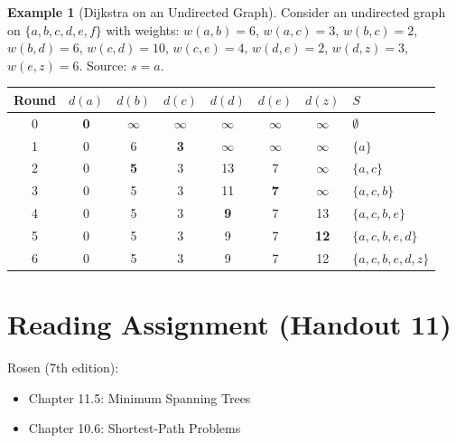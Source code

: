 \documentclass[11pt, a4paper, notitlepage]{report}
\theoremstyle{definition}
\newtheorem{example}[theorem]{Example}
\theoremstyle{remark}
\begin{document}
\begin{example}[Dijkstra on an Undirected Graph]
\label{ex:dijkstra-undirected}
Consider an undirected graph on $\{a,b,c,d,e,f\}$ with weights:
$w(a,b)=6$, $w(a,c)=3$, $w(b,c)=2$, $w(b,d)=6$, $w(c,d)=10$,
$w(c,e)=4$, $w(d,e)=2$, $w(d,z)=3$, $w(e,z)=6$. Source: $s = a$.

\begin{center}
\begin{tabular}{c|cccccc|l}
\hline
Round & $d(a)$ & $d(b)$ & $d(c)$ & $d(d)$ & $d(e)$ & $d(z)$ & $S$ \\
\hline
0 & \textbf{0} & $\infty$ & $\infty$ & $\infty$ & $\infty$ & $\infty$ & $\emptyset$ \\
1 & 0 & 6 & \textbf{3} & $\infty$ & $\infty$ & $\infty$ & $\{a\}$ \\
2 & 0 & \textbf{5} & 3 & 13 & 7 & $\infty$ & $\{a,c\}$ \\
3 & 0 & 5 & 3 & 11 & \textbf{7} & $\infty$ & $\{a,c,b\}$ \\
4 & 0 & 5 & 3 & \textbf{9} & 7 & 13 & $\{a,c,b,e\}$ \\
5 & 0 & 5 & 3 & 9 & 7 & \textbf{12} & $\{a,c,b,e,d\}$ \\
6 & 0 & 5 & 3 & 9 & 7 & 12 & $\{a,c,b,e,d,z\}$ \\
\hline
\end{tabular}
\end{center}
\end{example}

\section*{Reading Assignment (Handout 11)}

Rosen (7th edition):
\begin{itemize}
  \item Chapter 11.5: Minimum Spanning Trees
  \item Chapter 10.6: Shortest-Path Problems
\end{itemize}
\end{document}
